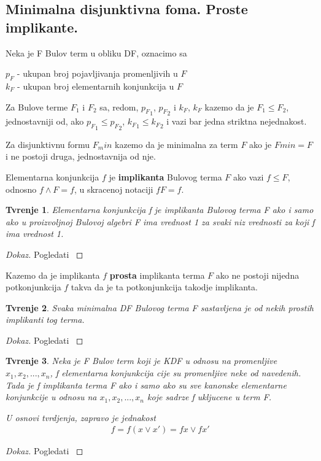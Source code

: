 \documentclass{article}
\newtheorem{theorem}{Tvr\dj enje}
\begin{document}
\subsection{Minimalna disjunktivna foma. Proste implikante.}
Neka je F Bulov term u obliku DF, oznacimo sa
\begin{addmargin}[4em]{2em}
	$p_F$ - ukupan broj pojavljivanja promenljivih u $F$ \\
	$k_F$ - ukupan broj elementarnih konjunkcija u $F$
\end{addmargin}

Za Bulove terme $F_1$ i $F_2$ sa, redom, ${p_F}_1$, ${p_F}_2$ i $k_F$, $k_F$ kazemo da je $F_1 \leq F_2$, jednostavniji od, ako ${p_F}_1 \leq {p_F}_2$, ${k_F}_1 \leq {k_F}_2$ i vazi bar jedna striktna nejednakost.

Za disjunktivnu formu $F_min$ kazemo da je minimalna za term $F$ ako je $Fmin = F$ i ne postoji druga, jednostavnija od nje.

Elementarna konjunkcija $f$ je \textbf{implikanta} Bulovog terma $F$ ako vazi $f \leq F$, odnosno $f \wedge F = f$, u skracenoj notaciji $fF = f$.
\begin{theorem}
	Elementarna konjunkcija f je implikanta Bulovog terma F ako i samo ako u proizvoljnoj Bulovoj algebri F ima vrednost 1 za svaki niz vrednosti za koji f ima vrednost 1.
\end{theorem}
\begin{proof}[Dokaz]
	Pogledati \cite{dokaz1}
\end{proof}

Kazemo da je implikanta $f$ \textbf{prosta} implikanta terma $F$ ako ne postoji nijedna potkonjunkcija $f$ takva da je ta potkonjunkcija takodje implikanta.

\begin{theorem}
	Svaka minimalna DF Bulovog terma F sastavljena je od nekih prostih implikanti tog terma.
\end{theorem}
\begin{proof}[Dokaz]
	Pogledati \cite{dokaz2}
\end{proof}

\begin{theorem}
	Neka je F Bulov term koji je KDF u odnosu na promenljive $x_1, x_2, ..., x_n$, f elementarna konjunkcija cije su promenljive neke od navedenih. Tada je f implikanta terma F ako i samo ako su sve kanonske elementarne konjunkcije u odnosu na $x_1, x_2, ..., x_n$ koje sadrze f ukljucene u term F.
	
	U osnovi tvrdjenja, zapravo je jednakost
	\begin{align*}
		f = f (x \vee x') = fx \vee fx'
	\end{align*}
\end{theorem}
\begin{proof}[Dokaz]
	Pogledati \cite{dokaz3}
\end{proof}
\end{document}

